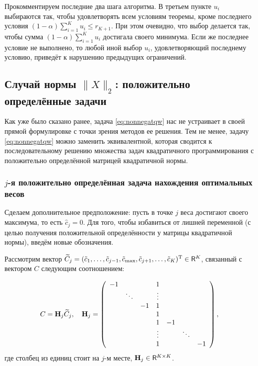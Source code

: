\documentclass[12pt,a4paper]{article}
\begin{document}
	Прокомментируем последние два шага алгоритма. В третьем пункте $u_i$ выбираются так, чтобы удовлетворять всем условиям теоремы, кроме последнего условия $(1 - \alpha) \sum_{i=1}^K u_i \le r_{K+1}$. При этом очевидно, что выбор делается так, чтобы сумма $(1 - \alpha) \sum_{i=1}^K u_i$ достигала своего минимума. Если же последнее условие не выполнено, то любой иной выбор $u_i$, удовлетворяющий последнему условию, приведёт к нарушению предыдущих ограничений.

\subsection{Случай нормы $\|X\|_2$: положительно определённые задачи}
Как уже было сказано ранее, задача \eqref{eq:nonnegatqw} нас не устраивает в своей прямой формулировке с точки зрения методов ее решения. Тем не менее, задачу \eqref{eq:nonnegatqw} можно заменить эквивалентной, которая сводится к последовательному решению множества задач квадратичного программирования с положительно определённой матрицей квадратичной нормы.
\subsubsection{$j$-я положительно определённая задача нахождения оптимальных весов}
Сделаем дополнительное предположение: пусть в точке $j$ веса достигают своего максимума, то есть $\hat c_j = 0$. Для того, чтобы избавиться от лишней переменной (с целью получения положительной определённости у матрицы квадратичной нормы), введём новые обозначения.

Рассмотрим вектор $\widetilde C_j = (\tilde c_1, \ldots, \tilde c_{j-1}, \tilde c_\text{max}, \tilde c_{j+1}, \ldots, \tilde c_K)^{\mathrm{T}} \in \mathsf{R}^K$, связанный с вектором $C$ следующим соотношением:

\begin{equation} \label{eq:h_jmatrix} C = \mathbf{H}_j \widetilde C_j, \quad
\mathbf{H}_j = \left(
\begin{array}{ccccccc}
-1 &  &  & 1 &  &  &  \\ 
& \ddots &  & \vdots &  &  &  \\ 
&  & -1 & 1 &  &  &  \\ 
&  &  & 1 &  &  &  \\ 
&  &  & 1 & -1 &  &  \\ 
&  &  & \vdots &  & \ddots &  \\ 
&  &  & 1 &  &  & -1
\end{array} 
\right),
\end{equation}
где столбец из единиц стоит на $j$-м месте, $\mathbf{H}_j \in \mathsf{R}^{K \times K}$.
\end{document}
